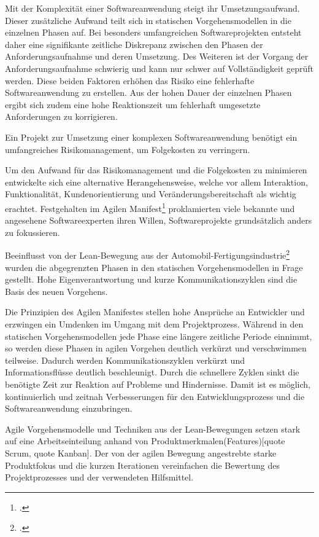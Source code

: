 Mit der Komplexität einer Softwareanwendung steigt ihr Umsetzungsaufwand. Dieser zusätzliche Aufwand teilt sich in statischen Vorgehensmodellen in die einzelnen Phasen auf. Bei besonders umfangreichen Softwareprojekten entsteht daher eine signifikante zeitliche Diskrepanz zwischen den Phasen der Anforderungsaufnahme und deren Umsetzung. Des Weiteren ist der Vorgang der Anforderungsaufnahme schwierig und kann nur schwer auf Vollständigkeit geprüft werden. Diese beiden Faktoren erhöhen das Risiko eine fehlerhafte Softwareanwendung zu erstellen. Aus der hohen Dauer der einzelnen Phasen ergibt sich zudem eine hohe Reaktionszeit um fehlerhaft umgesetzte Anforderungen zu korrigieren.

Ein Projekt zur Umsetzung einer komplexen Softwareanwendung benötigt ein umfangreiches Risikomanagement, um Folgekosten 
zu verringern.

Um den Aufwand für das Risikomanagement und die Folgekosten zu minimieren entwickelte sich eine alternative
Herangehensweise, welche vor allem Interaktion, Funktionalität, Kundenorientierung und Veränderungsbereitschaft als
wichtig erachtet. Festgehalten im Agilen Manifest\footcite[vgl.][]{agile-manifest} proklamierten viele bekannte und angesehene
Softwareexperten ihren Willen, Softwareprojekte grundsätzlich anders zu fokussieren.

Beeinflusst von der Lean-Bewegung aus der Automobil-Fertigungsindustrie\footcite[vgl.][]{kent1999} wurden die abgegrenzten Phasen 
in den statischen Vorgehensmodellen in Frage gestellt. Hohe Eigenverantwortung und kurze Kommunikationszyklen sind die 
Basis des neuen Vorgehens.

Die Prinzipien des \glqq Agilen Manifestes\grqq{} stellen hohe Ansprüche an Entwickler und erzwingen ein Umdenken im Umgang mit dem Projektprozess. Während in den statischen Vorgehensmodellen jede Phase eine längere zeitliche Periode einnimmt, so werden diese Phasen in agilen Vorgehen deutlich verkürzt und verschwimmen teilweise. Dadurch werden Kommunikationszyklen verkürzt und Informationsflüsse deutlich beschleunigt.
Durch die schnellere Zyklen sinkt die benötigte Zeit zur Reaktion auf Probleme und Hindernisse. Damit ist es möglich, kontinuierlich und zeitnah Verbesserungen für den Entwicklungsprozess und die Softwareanwendung einzubringen. 

Agile Vorgehensmodelle und Techniken aus der Lean-Bewegungen setzen stark auf eine Arbeitseinteilung anhand von Produktmerkmalen(Features)[quote Scrum, quote Kanban]. Der von der agilen Bewegung angestrebte starke Produktfokus und die kurzen Iterationen vereinfachen die Bewertung des Projektprozesses und der verwendeten Hilfsmittel.

